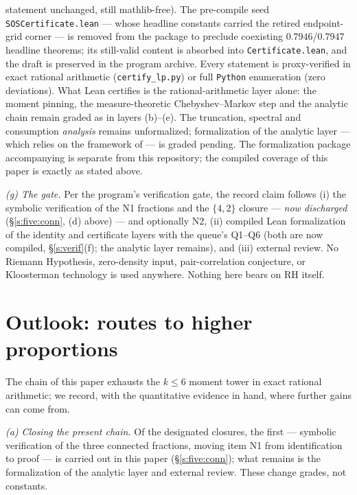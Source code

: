 \documentclass[11pt]{article}
\numberwithin{equation}{section}
\theoremstyle{definition}
\theoremstyle{remark}
\begin{document}
statement unchanged, still mathlib-free). The pre-compile seed
\texttt{SOSCertificate.lean} --- whose headline constants
carried the retired endpoint-grid corner --- is removed from the
package to preclude coexisting $0.7946$/$0.7947$ headline
theorems; its still-valid content is absorbed into
\texttt{Certificate.lean}, and the draft is preserved in the
program archive. Every statement is proxy-verified in
exact rational arithmetic (\texttt{certify\_lp.py}) or full
\texttt{Python} enumeration (zero deviations). What Lean
certifies is the rational-arithmetic layer alone: the moment
pinning, the measure-theoretic Chebyshev--Markov step and the
analytic chain remain graded as in layers (b)--(e). The truncation, spectral and consumption
\emph{analysis} remains unformalized; formalization of the
analytic layer --- which relies on the framework of
\cite{C26} --- is graded pending. The formalization package
accompanying \cite{C26} is separate from this repository; the
compiled coverage of this paper is exactly as stated above.

\emph{(g) The gate.} Per the program's verification gate, the
record claim follows (i) the symbolic verification of the
N1 fractions and the $\{4,2\}$ closure --- \emph{now
discharged} (\S\ref{s:five:conn}, (d) above) --- and
optionally N2, (ii) compiled Lean formalization of the identity
and certificate layers with the queue's Q1--Q6 (both are now
compiled, \S\ref{s:verif}(f); the analytic layer remains), and
(iii)
external review. No Riemann Hypothesis, zero-density input,
pair-correlation conjecture, or Kloosterman technology is used
anywhere. Nothing here bears on RH itself.

\section{Outlook: routes to higher
proportions}\label{s:outlook}

The chain of this paper exhausts the $k\le6$ moment tower in
exact rational arithmetic; we record, with the quantitative
evidence in hand, where further gains can come from.

\emph{(a) Closing the present chain.} Of the designated
closures, the first --- symbolic verification of the three
connected fractions, moving item N1 from identification to
proof --- is carried out in this paper (\S\ref{s:five:conn});
what remains is the formalization of the analytic layer and
external review. These change grades, not constants.
\end{document}
